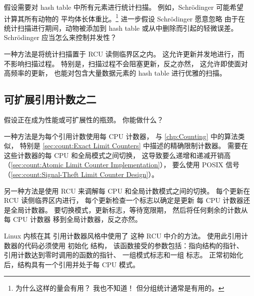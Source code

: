 假设需要对 hash table 中所有元素进行统计扫描。
例如，Schr\"odinger 可能希望计算其所有动物的
平均体长体重比。\footnote{
	为什么这样的量会有用？
	我也不知道！
	但分组统计通常是有用的。}
进一步假设 Schr\"odinger 愿意忽略
由于在统计扫描进行期间，动物被添加到
hash table 或从中删除而引起的轻微误差。
Schr\"odinger 应当怎么来控制并发性？

一种方法是将统计扫描置于 RCU 读侧临界区之内。
这允许更新并发地进行，而不影响扫描过程。
特别是，扫描过程不会阻塞更新，反之亦然，
这允许即使面对高频率的更新，
也能对包含大量数据元素的 hash table 进行优雅的扫描。

\QuickQuizEnd

\subsection{可扩展引用计数之二}
\label{sec:together:Scalable Reference Count Two}

假设正在成为性能或可扩展性的瓶颈。
你能做什么？

一种方法是为每个引用计数使用每 CPU 计数器，
与 \cref{chp:Counting} 中的算法类似，
特别是 \cref{sec:count:Exact Limit Counters}
中描述的精确限制计数器。
需要在这些计数器的每 CPU 和全局模式之间切换，
这导致要么递增和递减开销高
（\cref{sec:count:Atomic Limit Counter Implementation}），
要么使用 POSIX 信号
（\cref{sec:count:Signal-Theft Limit Counter Design}）。

另一种方法是使用 RCU 来调解每 CPU 和全局计数模式之间的切换。
每个更新在 RCU 读侧临界区内进行，
每个更新检查一个标志以确定是更新
每 CPU 计数器还是全局计数器。
要切换模式，更新标志，等待宽限期，
然后将任何剩余的计数从每 CPU 计数器
移到全局计数器，反之亦然。

Linux 内核在其  引用计数器风格中使用了
这种 RCU 中介的方法。
使用此引用计数器的代码必须使用 
初始化  结构，
该函数接受的参数包括：指向结构的指针、
引用计数达到零时调用的函数的指针、
一组模式标志和一组   标志。
正常初始化后，结构具有一个引用并处于每 CPU 模式。

